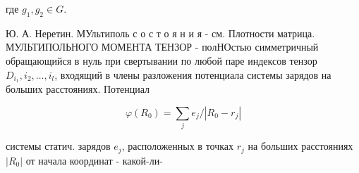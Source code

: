 \documentclass[10pt]{article}
\begin{document}
где $g_{1}, g_{2} \in G$.



Ю. А. Неретин. МУльтиполь с о с т о я н и я - см. Плотности матрица. МУЛЬТИПОЛЬНОГО МОМЕНТА ТЕНЗОР - полНОстью симметричный обращающийся в нуль при свертывании по любой паре индексов тензор $D_{i_{1}}, i_{2}, \ldots, i_{l}$, входящий в члены разложения потенциала системы зарядов на больших расстояниях. Потенциал



\[

\varphi\left(R_{0}\right)=\sum_{j} e_{j} /\left|R_{0}-r_{j}\right|

\]



системы статич. зарядов $e_{j}$, расположенных в точках $r_{j}$ на больших расстояниях $\left|R_{0}\right|$ от начала координат - какой-ли-
\end{document}
